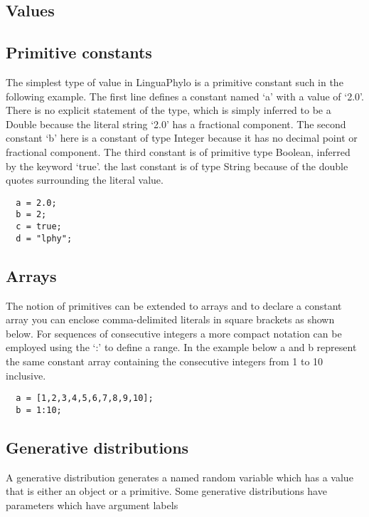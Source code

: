 \documentclass[oneside]{article}
\begin{document}
\subsection{Values}

\subsection{Primitive constants}

The simplest type of value in LinguaPhylo is a primitive constant such in the following example. The first line defines a constant named `a' with a value of `2.0'. There is no explicit statement of the type, which is simply inferred to be a Double because the literal string `2.0' has a fractional component. The second constant `b' here is a constant of type Integer because it has no decimal point or fractional component. The third constant is of primitive type Boolean, inferred by the keyword `true'. the last constant is of type String because of the double quotes surrounding the literal value.

{\singlespacing
\begin{verbatim}
  a = 2.0;
  b = 2;
  c = true;
  d = "lphy";
\end{verbatim}
}

\subsection{Arrays}

The notion of primitives can be extended to arrays and to declare a constant array you can enclose comma-delimited literals in square brackets as shown below. For sequences of consecutive integers a more compact notation can be employed using the `:' to define a range. In the example below a and b represent the same constant array containing the consecutive integers from 1 to 10 inclusive.

\begin{verbatim}
  a = [1,2,3,4,5,6,7,8,9,10];
  b = 1:10;
\end{verbatim}

\subsection{Generative distributions}

A generative distribution generates a named random variable which has a value that is either an object or a primitive. Some generative distributions have parameters which have argument labels
\end{document}
